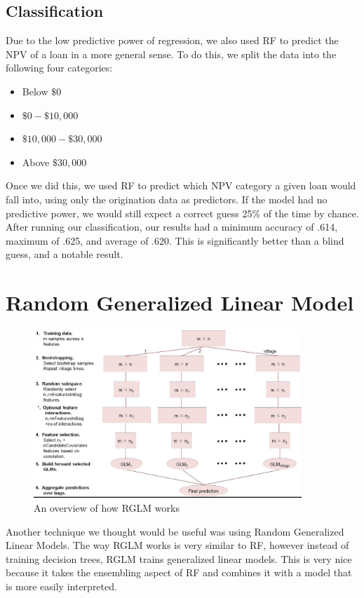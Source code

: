 \documentclass[12 pt]{uncw_thesis}
\theoremstyle{plain}
\theoremstyle{remark}
\theoremstyle{definition}
\begin{document}
\subsection{Classification}
Due to the low predictive power of regression, we also used RF to predict the NPV of a loan in a more general sense. To do this, we split the data into the following four categories: 
\begin{itemize}
	\item Below $\$0$
	\item $\$0 - \$10,000$
	\item $\$10,000 - \$30,000$
	\item Above $\$30,000$
\end{itemize}
Once we did this, we used RF to predict which NPV category a given loan would fall into, using only the origination data as predictors. If the model had no predictive power, we would still expect a correct guess 25\% of the time by chance. After running our classification, our results had a minimum accuracy of .614, maximum of .625, and average of .620. This is significantly better than a blind guess, and a notable result. 
\section{Random Generalized Linear Model}
\begin{figure}
	\includegraphics[width=0.9\textwidth]{images/RGLM.jpg}
	\caption{An overview of how RGLM works \cite{RGLM}}
	\label{fig:RGLM}
\end{figure}
Another technique we thought would be useful was using Random Generalized Linear Models. The way RGLM works is very similar to RF, however instead of training decision trees, RGLM trains generalized linear models. This is very nice because it takes the ensembling aspect of RF and combines it with a model that is more easily interpreted.
\end{document}
